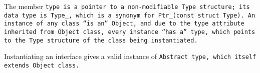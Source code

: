 The member \tt{type} is a pointer to a non-modifiable \tt{Type} structure; its
data type is \tt{Type_}, which is a synonym for \tt{Ptr_(const struct Type)}.
An instance of any class ``is an'' \tt{Object}, and due to the \tt{type}
attribute inherited from \tt{Object} class, every instance ``has a'' \tt{type},
which points to the \tt{Type} structure of the class being instantiated.

\note Instantiating an interface gives a valid instance of
\tt{Abstract} type, which itself extends \tt{Object} class.

